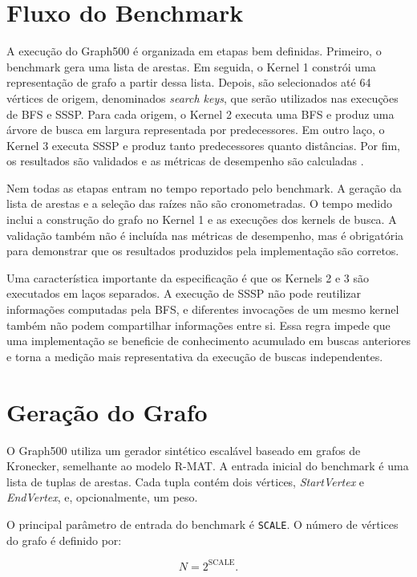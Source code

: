 \section{Fluxo do Benchmark}
\label{sec:graph500-fluxo}

A execução do Graph500 é organizada em etapas bem definidas. 
Primeiro, o benchmark gera uma lista de arestas. 
Em seguida, o Kernel 1 constrói uma representação de grafo a partir dessa lista. 
Depois, são selecionados até 64 vértices de origem, denominados \textit{search keys}, 
que serão utilizados nas execuções de BFS e SSSP. 
Para cada origem, o Kernel 2 executa uma BFS e 
produz uma árvore de busca em largura representada por predecessores. 
Em outro laço, o Kernel 3 executa SSSP e produz tanto predecessores quanto distâncias. 
Por fim, os resultados são validados e as métricas de desempenho são calculadas \cite{graph500spec}.

Nem todas as etapas entram no tempo reportado pelo benchmark. 
A geração da lista de arestas e a seleção das raízes não são cronometradas. 
O tempo medido inclui a construção do grafo no Kernel 1 e as execuções dos kernels de busca. 
A validação também não é incluída nas métricas de desempenho, 
mas é obrigatória para demonstrar que os resultados produzidos pela implementação são corretos.

Uma característica importante da especificação é que os Kernels 2 e 3 são executados em laços separados. 
A execução de SSSP não pode reutilizar informações computadas pela BFS, e diferentes invocações de um mesmo kernel também não podem compartilhar informações entre si. Essa regra impede que uma implementação se beneficie de conhecimento acumulado em buscas anteriores e torna a medição mais representativa da execução de buscas independentes.

\section{Geração do Grafo}
\label{sec:graph500-geracao-grafo}

O Graph500 utiliza um gerador sintético escalável baseado em grafos de Kronecker, semelhante ao modelo R-MAT. 
A entrada inicial do benchmark é uma lista de tuplas de arestas. 
Cada tupla contém dois vértices, \textit{StartVertex} e \textit{EndVertex}, 
e, opcionalmente, um peso. 

O principal parâmetro de entrada do benchmark é \texttt{SCALE}. O número de vértices do grafo é definido por:

\begin{equation}
N = 2^{\mathrm{SCALE}}.
\end{equation}

